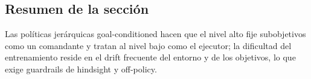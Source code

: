 \subsection{Resumen de la sección}

Las políticas jerárquicas goal-conditioned hacen que el nivel alto fije subobjetivos como un comandante y tratan al nivel bajo como el ejecutor; la dificultad del entrenamiento reside en el drift frecuente del entorno y de los objetivos, lo que exige guardrails de hindsight y off-policy.
